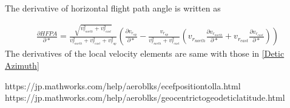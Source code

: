\documentclass[11pt]{article}
\begin{document}
\noindent The derivative of horizontal flight path angle is written as

\begin{equation}
	\label{eq:rel_velocity_HFPA_deriv}
	\begin{aligned}
		\frac{\partial HFPA}{\partial *} =
		\frac{\sqrt{v_{r_{north}}^2 + v_{r_{east}}^2}}{v_{r_{north}}^2 + v_{r_{east}}^2 + v_{r_{up}}^2}
		\left(
		\frac{\partial v_{r_{up}}}{\partial *}
		- \frac{v_{r_{up}}}{v_{r_{north}}^2 + v_{r_{east}}^2}
		\left(
		v_{r_{north}}\frac{\partial v_{r_{north}}}{\partial *} + v_{r_{east}}\frac{\partial v_{r_{east}}}{\partial *}
		\right)
		\right)
	\end{aligned}
\end{equation}
The derivatives of the local velocity elements are same with those in \ref{Detic Azimuth}

\begin{thebibliography}{99}
	 https://jp.mathworks.com/help/aeroblks/ecefpositiontolla.html
   https://jp.mathworks.com/help/aeroblks/geocentrictogeodeticlatitude.html
\end{thebibliography}
\end{document}
